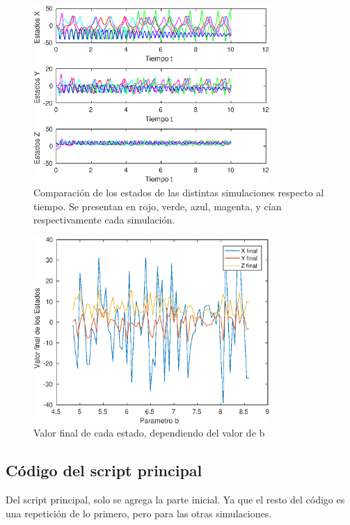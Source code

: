\documentclass[12pt,letterpaper]{article}
\begin{document}
\begin{figure}
	\centering
	\includegraphics[width=0.8\textwidth]{pictures/comparacion}
	\caption{Comparación de los estados de las distintas simulaciones respecto al tiempo. Se presentan en rojo, verde, azul, magenta, y cían respectivamente cada simulación.}
	\label{fig:comparacion}
\end{figure}


\begin{figure}
	\centering
	\includegraphics[width=0.8\textwidth]{pictures/sensibilidad}
	\caption{Valor final de cada estado, dependiendo del valor de b}
	\label{fig:sensibilidad}
\end{figure}

\subsection{Código del script principal}
Del script principal, solo se agrega la parte inicial. Ya que el resto del código es una repetición de lo primero, pero para las otras simulaciones.

\end{document}
